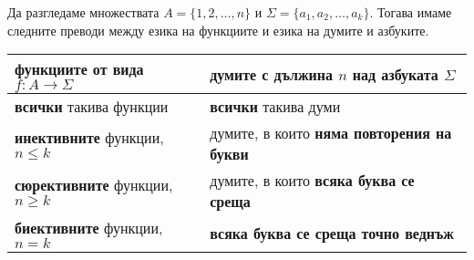 \begin{remark}
  Да разгледаме множествата $A=\{1,2,\dots,n\}$ и $\Sigma = \{a_1,a_2,\dots,a_k\}$.
  Тогава имаме следните преводи между езика на функциите и езика на думите и азбуките.
  \newline
  \begin{tabular}{|l|l|}
    \hline
    функциите от вида $f:A\to \Sigma$ & думите с дължина $n$ над азбуката $\Sigma$ \\
    \hline
    \hline
    {\bf всички} такива функции & {\bf всички} такива думи\\
    \hline
    {\bf инективните} функции, $n \leq k$ & думите, в които {\bf няма повторения на букви} \\
    \hline
    {\bf сюрективните} функции, $n \geq k$ & думите, в които {\bf всяка буква се среща} \\
    \hline
    {\bf биективните} функции, $n = k$ & {\bf всяка буква се среща точно веднъж} \\
    \hline
  \end{tabular}


\end{remark}

